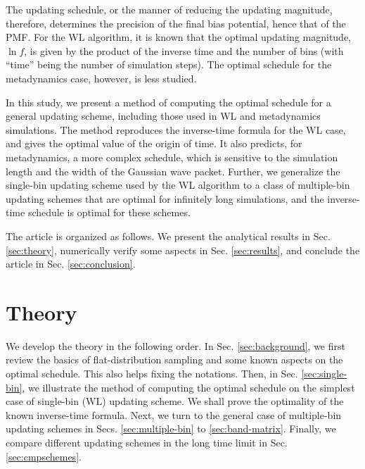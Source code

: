 \documentclass[reprint, floatfix]{revtex4-1}
\begin{document}
The updating schedule,
or the manner of reducing
the updating magnitude,
therefore,
determines the precision of the final bias potential,
hence that of the PMF\cite{liang2007,
belardinelli2007, belardinelli2007jcp, belardinelli2008,
morozov2007, zhou2008, morozov2009,
komura2012, caparica2012, caparica2014,
barducci2008, dickson2011, dama2014}.
%
For the WL algorithm, it is known
that the optimal updating magnitude, $\ln f$,
is given by the product of the
inverse time\cite{liang2007,
belardinelli2007, belardinelli2007jcp, belardinelli2008,
morozov2007, zhou2008}
and the number of bins
(with ``time'' being
the number of simulation steps).
%
The optimal schedule for the metadynamics case,
however, is less studied.


In this study,
we present a method of computing
the optimal schedule
for a general updating scheme,
including those used in WL and metadynamics simulations.
%
The method reproduces the inverse-time formula
for the WL case,
and gives the optimal value of the origin of time.
%
It also predicts, for metadynamics,
a more complex schedule,
which is sensitive to the simulation length
and the width of the Gaussian wave packet.
%
Further, we generalize
the single-bin updating scheme
used by the WL algorithm
to a class of multiple-bin updating schemes
that are optimal for infinitely long simulations,
and the inverse-time schedule is optimal for these schemes.
%



The article is organized as follows.
%
We present the analytical results in Sec. \ref{sec:theory},
numerically verify some aspects
in Sec. \ref{sec:results},
and conclude the article
in Sec. \ref{sec:conclusion}.




\section{\label{sec:theory}
Theory}



We develop the theory
in the following order.
%
In Sec. \ref{sec:background},
we first review the basics of
flat-distribution sampling
and some known aspects on the optimal schedule.
%
This also helps fixing the notations.
%
Then, in Sec. \ref{sec:single-bin},
we illustrate the method of
computing the optimal schedule
on the simplest case of
single-bin (WL) updating scheme.
%
We shall prove the optimality
of the known inverse-time formula.
%
Next, we turn to the general case
of multiple-bin updating schemes
in Secs. \ref{sec:multiple-bin}
to \ref{sec:band-matrix}.
%
Finally, we compare different updating schemes
in the long time limit
in Sec. \ref{sec:cmpschemes}.
\end{document}
